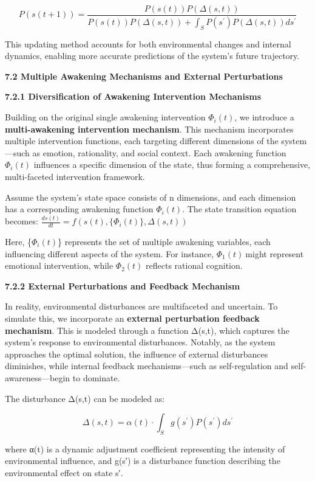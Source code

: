 \documentclass[
]{article}
\begin{document}
\[P\left( s(t + 1) \right) = \frac{P\left( s(t) \right)P\left( \Delta(s,t) \right)}{P\left( s(t) \right)P\left( \Delta(s,t) \right) + \int_{S}^{}P\left( s^{'} \right)P\left( \Delta(s,t) \right)ds^{'}}\]

This updating method accounts for both environmental changes and
internal dynamics, enabling more accurate predictions of the system's
future trajectory.

\textbf{7.2 Multiple Awakening Mechanisms and External Perturbations}

\textbf{7.2.1 Diversification of Awakening Intervention Mechanisms}

Building on the original single awakening intervention \(\Phi_{i}(t)\),
we introduce a \textbf{multi-awakening intervention mechanism}. This
mechanism incorporates multiple intervention functions, each targeting
different dimensions of the system---such as emotion, rationality, and
social context. Each awakening function \(\Phi_{i}(t)\) influences a
specific dimension of the state, thus forming a comprehensive,
multi-faceted intervention framework.

Assume the system's state space consists of n dimensions, and each
dimension has a corresponding awakening function \(\Phi_{i}(t)\). The
state transition equation becomes:
\(\frac{ds(t)}{dt} = f\left( s(t),\{\Phi_{i}(t)\},\Delta(s,t) \right)\)

Here, \{\(\Phi_{i}(t)\)\} represents the set of multiple awakening
variables, each influencing different aspects of the system. For
instance, \(\Phi_{1}(t)\ \)might represent emotional intervention, while
\(\Phi_{2}(t)\) reflects rational cognition.

\textbf{7.2.2 External Perturbations and Feedback Mechanism}

In reality, environmental disturbances are multifaceted and uncertain.
To simulate this, we incorporate an \textbf{external perturbation
feedback mechanism}. This is modeled through a function Δ(s,t), which
captures the system's response to environmental disturbances. Notably,
as the system approaches the optimal solution, the influence of external
disturbances diminishes, while internal feedback mechanisms---such as
self-regulation and self-awareness---begin to dominate.

The disturbance Δ(s,t) can be modeled as:

\[\Delta(s,t) = \alpha(t) \cdot \int_{S}^{}g\left( s^{'} \right)P\left( s^{'} \right)ds^{'}\]

where α(t) is a dynamic adjustment coefficient representing the
intensity of environmental influence, and g(s′) is a disturbance
function describing the environmental effect on state s′.
\end{document}
